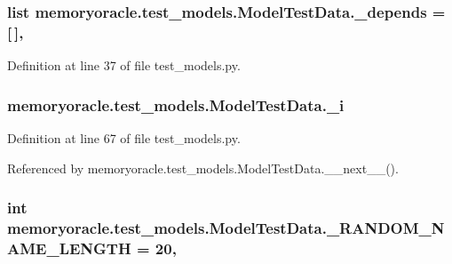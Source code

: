 \subsubsection[{\+\_\+depends}]{\setlength{\rightskip}{0pt plus 5cm}list memoryoracle.\+test\+\_\+models.\+Model\+Test\+Data.\+\_\+depends = \mbox{[}$\,$\mbox{]}\hspace{0.3cm}{\ttfamily [static]}, {\ttfamily [private]}}\label{classmemoryoracle_1_1test__models_1_1ModelTestData_a9242b20987740acb57afbfb594d216a7}


Definition at line 37 of file test\+\_\+models.\+py.

\hypertarget{classmemoryoracle_1_1test__models_1_1ModelTestData_a629e30f2cea7dadc53d5aadc08f35c3c}{}
\subsubsection[{\+\_\+i}]{\setlength{\rightskip}{0pt plus 5cm}memoryoracle.\+test\+\_\+models.\+Model\+Test\+Data.\+\_\+i\hspace{0.3cm}{\ttfamily [private]}}\label{classmemoryoracle_1_1test__models_1_1ModelTestData_a629e30f2cea7dadc53d5aadc08f35c3c}


Definition at line 67 of file test\+\_\+models.\+py.



Referenced by memoryoracle.\+test\+\_\+models.\+Model\+Test\+Data.\+\_\+\+\_\+next\+\_\+\+\_\+().

\hypertarget{classmemoryoracle_1_1test__models_1_1ModelTestData_a0711df5f5b31a36668f3eaf298997784}{}
\subsubsection[{\+\_\+\+R\+A\+N\+D\+O\+M\+\_\+\+N\+A\+M\+E\+\_\+\+L\+E\+N\+G\+T\+H}]{\setlength{\rightskip}{0pt plus 5cm}int memoryoracle.\+test\+\_\+models.\+Model\+Test\+Data.\+\_\+\+R\+A\+N\+D\+O\+M\+\_\+\+N\+A\+M\+E\+\_\+\+L\+E\+N\+G\+T\+H = 20\hspace{0.3cm}{\ttfamily [static]}, {\ttfamily [private]}}\label{classmemoryoracle_1_1test__models_1_1ModelTestData_a0711df5f5b31a36668f3eaf298997784}


